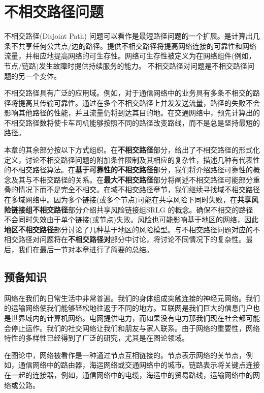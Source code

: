 \chapter{不相交路径问题}


不相交路径(Disjoint Path) 问题可以看作是最短路径问题的一个扩展。是计算出几条不共享任何公共点/边的路径。提供不相交路径将提高网络连接的可靠性和网络流量，并相应地提高网络的可生存性。网络可生存性被定义为在网络组件(例如，节点/链路)发生故障时提供持续服务的能力\cite{zhou2000survivability}。 不相交路径对问题是不相交路径问题的另一个变体。

不相交路径具有广泛的应用域。例如，对于通信网络中的业务具有多条不相交的路径将提高其传输可靠性。通过在多个不相交路径上并发发送流量，路径的失败不会影响其他路径的性能，并且流量仍将到达其目的地。在交通网络中，预先计算出的不相交路径数将使卡车司机能够按照不同的路径改变路线，而不是总是坚持最短的路径。


本章的其余部分按以下方式组织。在\textbf{不相交路径}部分，给出了不相交路径的形式化定义，讨论不相交路径问题的附加条件限制及其相应的复杂性，描述几种有代表性的不相交路径算法。在\textbf{基于可靠性的不相交路径}部分，我们将介绍路径可靠性的概念及其与不相交路径的关系。在\textbf{最大不相交路径}部分将阐述不相交路径可能部分重叠的情况下而不是完全不相交。在域不相交路径章节，我们继续寻找域不相交路径在多域网络中。因为多个链接(或多个节点)可能在共享风险下同时失败，在\textbf{共享风险链接组不相交路径}部分介绍共享风险链接组SRLG 的概念。确保不相交的路径不会同时失效由于单个链接(或节点)失败。风险也可能影响基于地区的网络，因此\textbf{地区不相交路径}部分讨论了几种基于地区的风险模型。与不相交路径问题对应的不相交路径对问题将在\textbf{不相交路径对}部分中讨论，将讨论不同情况下的复杂性。最后，我们在最后一节对本章进行了简要的总结。

\section{预备知识}
网络在我们的日常生活中非常普遍。我们的身体组成突触连接的神经元网络。我们的运输网络使我们能够轻松地往返于不同的地方。互联网是我们巨大的信息门户也是世界域内的计算机网络。电网提供电力，而如果没有电力那我们现在社会都可能会停止运作。我们的社交网络让我们和朋友与家人联系。由于网络的重要性，网络特性的多样性已经得到了广泛的研究，尤其是在图论领域。

在图论中，网络被看作是一种通过节点互相链接的。节点表示网络的关节点，例如，通信网络中的路由器，海运网络或交通网络中的城市。链路表示将关键点连接在一起的连接器，例如，通信网络中的电缆，海运中的贸易路线，运输网络中的网络或公路。

